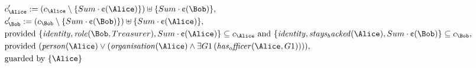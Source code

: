 \begin{align*}
&
c'_
{
\Alice
}
 := 
(c_
{
\Alice
}
 \setminus 
\{
Sum
\cdot
\text{\textcent}
(
\Alice
)
\}
) \uplus 
\{
Sum
\cdot
\text{\textcent}
(
\Bob
)
\}
,\\
&
c'_
{
\Bob
}
 := 
(c_
{
\Bob
}
 \setminus 
\{
Sum
\cdot
\text{\textcent}
(
\Bob
)
\}
) \uplus 
\{
Sum
\cdot
\text{\textcent}
(
\Alice
)
\}
,\\
&
\text{provided } 
\{
\mathit{
identity
}
,
\mathit{
role
}
(
\Bob
,
Treasurer
)
,
Sum
\cdot
\text{\textcent}
(
\Alice
)
\}
 \subseteq c_
{
\Alice
}
 \text{ and } 
\{
\mathit{
identity
}
,
\mathit{
stays_backed
}
(
\Alice
)
,
Sum
\cdot
\text{\textcent}
(
\Bob
)
\}
 \subseteq c_
{
\Bob
}
,\\
&
\text{provided } 
(
\mathit{
person
}
(
\Alice
)
\lor
(
\mathit{
organisation
}
(
\Alice
)
\land
\exists 
G1
\,(
\mathit{
has_officer
}
(
\Alice
,
G1
)
)
)
)
,\\
&
\text{guarded by } \{
\Alice
\}
\end{align*}

